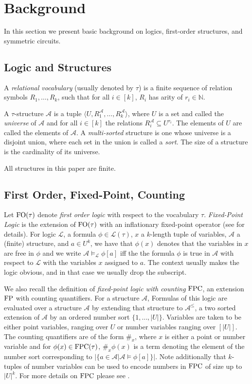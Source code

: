 \documentclass[12pt]{report}
\newcommand{\nats}{\mathbb{N}}
\newcommand{\logic}[1]{\text{\upshape #1}\xspace}
\newcommand{\FPC}{\logic{FPC}}
\newcommand{\FO}{\logic{FO}}
\newcommand{\FP}{\logic{FP}}
\begin{document}
\chapter{Background}
In this section we present basic background on logics, first-order structures,
and symmetric circuits.

\section{Logic and Structures}
A \emph{relational vocabulary} (usually denoted by $\tau$) is a finite sequence
of relation symbols $R_1, \ldots, R_k$, such that for all $i \in [k]$, $R_i$ has
arity of $r_i \in \nats$.

A $\tau$-structure $\mathcal{A}$ is a tuple $\langle U, R^{\mathcal{A}}_1 ,
\ldots , R^{\mathcal{A}}_k \rangle$, where $U$ is a set and called the
\emph{universe} of $\mathcal{A}$ and for all $i \in [k]$ the relations
$R^{\mathcal{A}}_i \subseteq U^{r_i}$. The elements of $U$ are called the
elements of $\mathcal{A}$. A \emph{multi-sorted} structure is one whose universe
is a disjoint union, where each set in the union is called a \emph{sort}. The
size of a structure is the cardinality of its universe.

All structures in this paper are finite.

\section{First Order, Fixed-Point, Counting}

Let $\FO(\tau)$ denote \emph{first order logic} with respect to the vocabulary
$\tau$. \emph{Fixed-Point Logic} is the extension of $\FO(\tau)$ with an
inflationary fixed-point operator (see \cite{} for details). For logic
$\mathcal{L}$, a formula $\phi \in \mathcal{L}(\tau)$, $x$ a $k$-length tuple of
variables, $\mathcal{A}$ a (finite) structure, and $a \in U^k$, we have that
$\phi (x)$ denotes that the variables in $x$ are free in $\phi$ and we write
$\mathcal{A} \models_{\mathcal{L}} \phi[a]$ iff the the formula $\phi$ is true
in $\mathcal{A}$ with respect to $\mathcal{L}$ with the variables $x$ assigned
to $a$. The context usually makes the logic obvious, and in that case we usually
drop the subscript.

We also recall the definition of \emph{fixed-point logic with counting} $\FPC$,
an extension $\FP$ with counting quantifiers. For a structure $\mathcal{A}$,
Formulas of this logic are evaluated over a structure $\mathcal{A}$ by extending
that structure to $\mathcal{A}^\leq$, a two sorted extension of $\mathcal{A}$ by
an ordered number sort $\{1, \ldots, \vert U\vert \}$. Variables are taken to be
either point variables, ranging over $U$ or number variables ranging over
$[\vert U \vert]$. The counting quantifiers are of the form $\#_x$, where $x$ is
either a point or number variable and for $\phi(x) \in \FPC(\tau)$, $\#_x
\phi(x)$ is a term denoting the element of the number sort corresponding to
$\vert \{a \in \mathcal{A} | \mathcal{A} \models \phi[a]\}\vert$. Note
additionally that $k$-tuples of number variables can be used to encode numbers
in $\FPC$ of size up to $\vert U\vert^k$. For more details on $\FPC$ please see
\cite{}.
\end{document}
